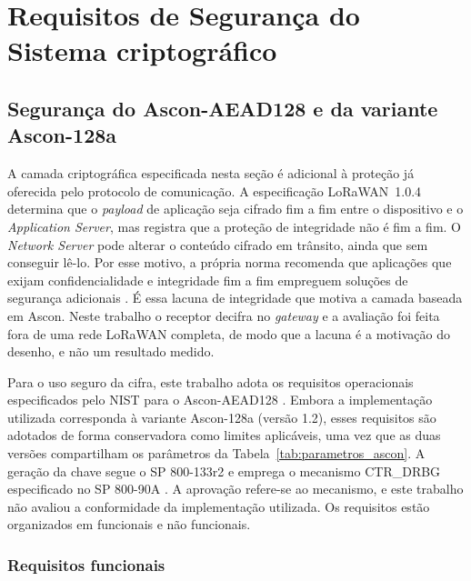 \section{Requisitos de Segurança do Sistema criptográfico}
\label{sec:requisitos_seguranca}
\subsection{Segurança do Ascon-AEAD128 e da variante Ascon-128a}
A camada criptográfica especificada nesta seção é adicional à proteção já oferecida pelo protocolo de comunicação. A especificação LoRaWAN~1.0.4 determina que o \textit{payload} de aplicação seja cifrado fim a fim entre o dispositivo e o \textit{Application Server}, mas registra que a proteção de integridade não é fim a fim. O \textit{Network Server} pode alterar o conteúdo cifrado em trânsito, ainda que sem conseguir lê-lo. Por esse motivo, a própria norma recomenda que aplicações que exijam confidencialidade e integridade fim a fim empreguem soluções de segurança adicionais \cite{lorawan104}. É essa lacuna de integridade que motiva a camada baseada em Ascon. Neste trabalho o receptor decifra no \textit{gateway} e a avaliação foi feita fora de uma rede LoRaWAN completa, de modo que a lacuna é a motivação do desenho, e não um resultado medido.

Para o uso seguro da cifra, este trabalho adota os requisitos operacionais especificados pelo NIST para o Ascon-AEAD128 \cite{nist800232}. Embora a implementação utilizada corresponda à variante Ascon-128a (versão 1.2), esses requisitos são adotados de forma conservadora como limites aplicáveis, uma vez que as duas versões compartilham os parâmetros da Tabela~\ref{tab:parametros_ascon}. A geração da chave segue o SP 800-133r2 \cite{barker2020nist133} e emprega o mecanismo CTR\_DRBG especificado no SP 800-90A \cite{barker2015nist90a}. A aprovação refere-se ao mecanismo, e este trabalho não avaliou a conformidade da implementação utilizada. Os requisitos estão organizados em funcionais e não funcionais.

\subsubsection{Requisitos funcionais}

